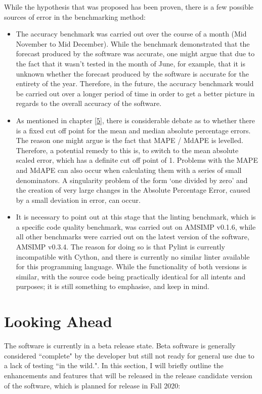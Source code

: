 While the hypothesis that was proposed has been proven, there is a few possible sources of error in the benchmarking method:

\begin{itemize}
    \item The accuracy benchmark was carried out over the course of a month (Mid November to Mid December). While the benchmark demonstrated that the forecast produced by the software was accurate, one might argue that due to the fact that it wasn't tested in the month of June, for example, that it is unknown whether the forecast produced by the software is accurate for the entirety of the year. Therefore, in the future, the accuracy benchmark would be carried out over a longer period of time in order to get a better picture in regards to the overall accuracy of the software.
    \item As mentioned in chapter \ref{5}, there is considerable debate as to whether there is a fixed cut off point for the mean and median absolute percentage errors. The reason one might argue is the fact that MAPE / MdAPE is levelled. Therefore, a potential remedy to this is, to switch to the mean absolute scaled error, which has a definite cut off point of 1. Problems with the MAPE and MdAPE can also occur when calculating them with a series of small denominators.  A singularity problem of the form `one divided by zero' and the creation of very large changes in the Absolute Percentage Error, caused by a small deviation in error, can occur.
    \item It is necessary to point out at this stage that the linting benchmark, which is a specific code quality benchmark, was carried out on AMSIMP v0.1.6, while all other benchmarks were carried out on the latest version of the software, AMSIMP v0.3.4. The reason for doing so is that Pylint is currently incompatible with Cython, and there is currently no similar linter available for this programming language. While the functionality of both versions is similar, with the source code being practically identical for all intents and purposes; it is still something to emphasise, and keep in mind.
\end{itemize}

\section{Looking Ahead}
The software is currently in a beta release state. Beta software is generally considered ``complete" by the developer but still not ready for general use due to a lack of testing ``in the wild."\cite{beta}. In this section, I will briefly outline the enhancements and features that will be released in the release candidate version of the software, which is planned for release in Fall 2020:

